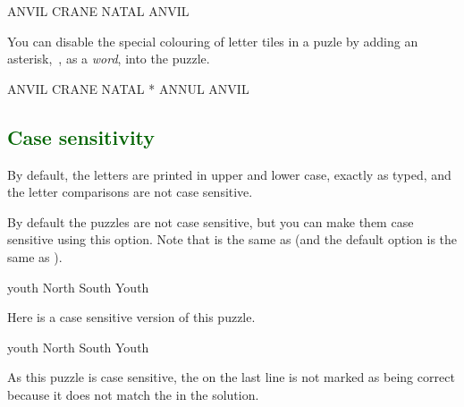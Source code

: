 \documentclass[svgnames]{report}
\newcommand\Section[1]{\subsection{\textcolor{DarkGreen}{#1}}}
\begin{document}
  \begin{example}
    \begin{wordle}[rows=2]{ANVIL}
      CRANE
      NATAL
      ANVIL
    \end{wordle}
  \end{example}


  \option[]{*}

  You can disable the special colouring of letter tiles in a
   puzle by adding an asterisk,~\option{*}, as a
  \textit{word}, into the puzzle.

  \begin{example}
    \begin{wordle}{ANVIL}
      CRANE
      NATAL
      *      %
      ANNUL
      ANVIL
    \end{wordle}
  \end{example}


  \Section{Case sensitivity}

  By default, the letters are printed in upper and lower case, exactly
  as typed, and the letter comparisons are not case sensitive.


  By default the  puzzles are not case sensitive, but
  you can make them case sensitive using this option. Note that
   is the same as 
  (and the default option is the same as
  ).

  \begin{example}
    \begin{wordle}[case sensitive=false]{youth} %
      North
      South
      Youth
    \end{wordle}
  \end{example}

  Here is a case sensitive version of this puzzle.

  \begin{example}
    \begin{wordle}{youth}
      North
      South
      Youth
    \end{wordle}
  \end{example}

  As this puzzle is case sensitive, the  on the last line is
  not marked as being correct because it does not match the 
  in the solution.
\end{document}
